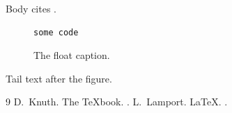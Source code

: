\documentclass{article}
\begin{document}
Body cites \cite{knuth,lamport}.
\begin{figure}
\begin{lstlisting}
some code
\end{lstlisting}
 \label{lst:x}
\caption{The float caption.}
\end{figure}
Tail text after the figure.
\begin{thebibliography}{9}
 D.~Knuth. \newblock The TeXbook. .
 L.~Lamport. \newblock LaTeX. .
\end{thebibliography}
\end{document}
